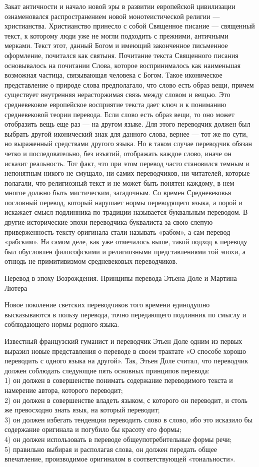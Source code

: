 Закат античности и начало новой эры в развитии европейской цивилизации ознаменовался распространением новой монотеистической религии --- христианства. Христианство принесло с собой Священное писание --- священный текст, к которому люди уже не могли подходить с прежними, античными мерками. Текст этот, данный Богом и имеющий законченное письменное оформление, почитался как святыня. Почитание текста Священного писания основывалось на почитании Слова, которое воспринималось как наименьшая возможная частица, связывающая человека с Богом. Такое иконическое представление о природе слова предполагало, что слово есть образ вещи, причем существует внутренняя нерасторжимая связь между словом и вещью. Это средневековое европейское восприятие текста дает ключ и к пониманию средневековой теории перевода. Если слово есть образ вещи, то оно может отобразить вещь еще раз --- на другом языке. Для этого переводчик должен был выбрать другой иконический знак для данного слова, вернее --- тот же по сути, но выраженный средствами другого языка. Но в таком случае переводчик обязан четко и последовательно, без изъятий, отображать каждое слово, иначе он исказит реальность. Тот факт, что при этом перевод часто становился темным и непонятным никого не смущало, ни самих переводчиков, ни читателей, которые полагали, что религиозный текст и не может быть понятен каждому, в нем многое должно быть мистическим, загадочным. Со времен Средневековья пословный перевод, который нарушает нормы переводящего языка, а порой и искажает смысл подлинника по традиции называется буквальным переводом. В другие исторические эпохи переводчика-буквалиста за свою слепую приверженность тексту оригинала стали называть «рабом», а сам перевод --- «рабским». На самом деле, как уже отмечалось выше, такой подход к переводу был обусловлен философскими и религиозными представлениями той эпохи, а отнюдь не примитивизмом средневековых переводчиков.

Перевод в эпоху Возрождения. Принципы перевода Этьена Доле и Мартина Лютера

Новое поколение светских переводчиков того времени единодушно высказываются в пользу перевода, точно передающего подлинник по смыслу и соблюдающего нормы родного языка.

Известный французский гуманист и переводчик Этьен Доле одним из первых выразил новые представления о переводе в своем трактате «О способе хорошо переводить с одного языка на другой». Так, Этьен Доле считал, что переводчик должен соблюдать следующие пять основных принципов перевода:
\\
1) он должен в совершенстве понимать содержание переводимого текста и намерение автора, которого переводит;
\\
2) он должен в совершенстве владеть языком, с которого он переводит, и столь же превосходно знать язык, на который переводит;
\\
3) он должен избегать тенденции переводить слово в слово, ибо это исказило бы содержание оригинала и погубило бы красоту его формы;
\\
4) он должен использовать в переводе общеупотребительные формы речи;
\\
5) правильно выбирая и располагая слова, он должен передать общее впечатление, производимое оригиналом в соответствующей «тональности».

